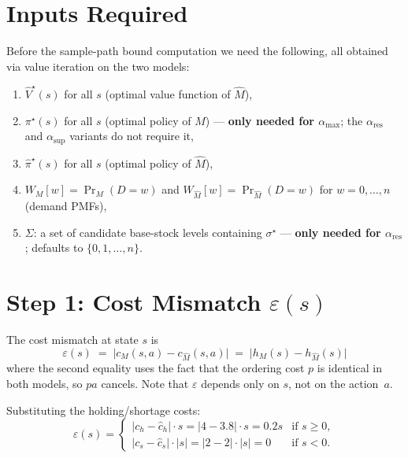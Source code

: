 \documentclass[11pt]{article}
\newcommand{\pistar}{\pi^\star}
\newcommand{\pihatstar}{\hat\pi^\star}
\newcommand{\Vhatstar}{\hat V^\star}
\newcommand{\alphares}{\alpha_{\mathrm{res}}}
\begin{document}
\section{Inputs Required}

Before the sample-path bound computation we need the following, all obtained
via value iteration on the two models:
%
\begin{enumerate}
  \item $\Vhatstar(s)$ for all $s$ \quad (optimal value function of $\hat M$),
  \item $\pistar(s)$ for all $s$ \quad (optimal policy of $M$) ---
        \textbf{only needed for $\alpha_{\max}$}; the $\alphares$ and
        $\alpha_{\sup}$ variants do not require it,
  \item $\pihatstar(s)$ for all $s$ \quad (optimal policy of $\hat M$),
  \item $W_M[w] = \Pr_M(D = w)$ and $W_{\hat M}[w] = \Pr_{\hat M}(D = w)$
        for $w = 0, \ldots, n$ \quad (demand PMFs),
  \item $\Sigma$: a set of candidate base-stock levels containing
        $\sigma^\star$ --- \textbf{only needed for $\alphares$};
        defaults to $\{0, 1, \ldots, n\}$.
\end{enumerate}

\section{Step 1: Cost Mismatch $\varepsilon(s)$}

The cost mismatch at state $s$ is
\begin{equation}\label{eq:epsilon}
  \varepsilon(s)
  \;=\; \bigl|c_M(s, a) - c_{\hat M}(s, a)\bigr|
  \;=\; \bigl|h_M(s) - h_{\hat M}(s)\bigr|
\end{equation}
where the second equality uses the fact that the ordering cost $p$ is identical
in both models, so $p a$ cancels.  Note that $\varepsilon$ depends only on
$s$, not on the action~$a$.

Substituting the holding/shortage costs:
\begin{equation}\label{eq:epsilon-explicit}
  \varepsilon(s) =
  \begin{cases}
    |c_h - \hat c_h| \cdot s = |4 - 3.8| \cdot s = 0.2 s
      & \text{if } s \ge 0, \\[4pt]
    |c_s - \hat c_s| \cdot |s| = |2 - 2| \cdot |s| = 0
      & \text{if } s < 0.
  \end{cases}
\end{equation}
\end{document}
